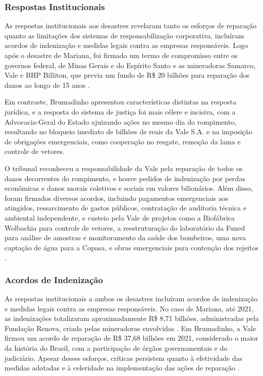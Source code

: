 \subsubsection{Respostas Institucionais}

As respostas institucionais aos desastres revelaram tanto os esforços de reparação quanto as limitações dos sistemas de responsabilização corporativa, incluíram acordos de indenização e medidas legais contra as empresas responsáveis. Logo após o desastre de Mariana, foi firmado um termo de compromisso entre os governos federal, de Minas Gerais e do Espírito Santo e as mineradoras Samarco, Vale e BHP Billiton, que previa um fundo de R\$ 20 bilhões para reparação dos danos ao longo de 15 anos \cite{greenpeace2016valor, brasil2024timeline}.

Em contraste, Brumadinho apresentou características distintas na resposta jurídica, e a resposta do sistema de justiça foi mais célere e incisiva, com a Advocacia-Geral do Estado ajuizando ações no mesmo dia do rompimento, resultando no bloqueio imediato de bilhões de reais da Vale S.A. e na imposição de obrigações emergenciais, como cooperação no resgate, remoção da lama e controle de vetores.

O tribunal reconheceu a responsabilidade da Vale pela reparação de todos os danos decorrentes do rompimento, e houve pedidos de indenização por perdas econômicas e danos morais coletivos e sociais em valores bilionários. Além disso, foram firmados diversos acordos, incluindo pagamentos emergenciais aos atingidos, ressarcimento de gastos públicos, contratação de auditoria técnica e ambiental independente, e custeio pela Vale de projetos como a Biofábrica Wolbachia para controle de vetores, a reestruturação do laboratório da Funed para análise de amostras e monitoramento da saúde dos bombeiros, uma nova captação de água para a Copasa, e obras emergenciais para contenção dos rejeitos \cite{minasgerais2024historico}.

\subsubsection{Acordos de Indenização}

As respostas institucionais a ambos os desastres incluíram acordos de indenização e medidas legais contra as empresas responsáveis. No caso de Mariana, até 2021, as indenizações totalizaram aproximadamente R\$ 8,71 bilhões, administradas pela Fundação Renova, criada pelas mineradoras envolvidas \cite{brasil2022indenizacoes}. Em Brumadinho, a Vale firmou um acordo de reparação de R\$ 37,68 bilhões em 2021, considerado o maior da história do Brasil, com a participação de órgãos governamentais e do judiciário. Apesar desses esforços, críticas persistem quanto à efetividade das medidas adotadas e à celeridade na implementação das ações de reparação \cite{brasil2022indenizacoes}.

